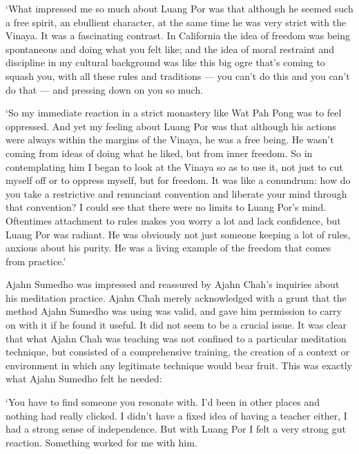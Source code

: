 `What impressed me so much about Luang Por was that although he seemed
such a free spirit, an ebullient character, at the same time he was very
strict with the Vinaya. It was a fascinating contrast. In California the
idea of freedom was being spontaneous and doing what you felt like; and
the idea of moral restraint and discipline in my cultural background was
like this big ogre that's coming to squash you, with all these rules and
traditions --- you can't do this and you can't do that --- and pressing
down on you so much.

`So my immediate reaction in a strict monastery like Wat Pah Pong was to
feel oppressed. And yet my feeling about Luang Por was that although his
actions were always within the margins of the Vinaya, he was a free
being. He wasn't coming from ideas of doing what he liked, but from
inner freedom. So in contemplating him I began to look at the Vinaya so
as to use it, not just to cut myself off or to oppress myself, but for
freedom. It was like a conundrum: how do you take a restrictive and
renunciant convention and liberate your mind through that convention? I
could see that there were no limits to Luang Por's mind. Oftentimes
attachment to rules makes you worry a lot and lack confidence, but Luang
Por was radiant. He was obviously not just someone keeping a lot of
rules, anxious about his purity. He was a living example of the freedom
that comes from practice.'

Ajahn Sumedho was impressed and reassured by Ajahn Chah's inquiries
about his meditation practice. Ajahn Chah merely acknowledged with a
grunt that the method Ajahn Sumedho was using was valid, and gave him
permission to carry on with it if he found it useful. It did not seem to
be a crucial issue. It was clear that what Ajahn Chah was teaching was
not confined to a particular meditation technique, but consisted of a
comprehensive training, the creation of a context or environment in
which any legitimate technique would bear fruit. This was exactly what
Ajahn Sumedho felt he needed:

`You have to find someone you resonate with. I'd been in other places
and nothing had really clicked. I didn't have a fixed idea of having a
teacher either, I had a strong sense of independence. But with Luang Por
I felt a very strong gut reaction. Something worked for me with him.

